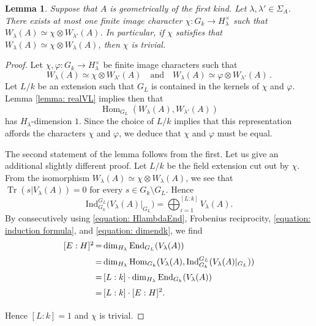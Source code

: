 \documentclass[oneside]{amsart}
\newtheorem{lemma}[theorem]{Lemma}
\theoremstyle{remark}
\newcommand{\Ind}{\mathrm{Ind}}
\newcommand{\End}{\operatorname{End}}
\newcommand{\Hom}{\operatorname{Hom}}
\newcommand{\Tr}{\operatorname{Tr}}
\numberwithin{equation}{section}
\begin{document}
\begin{lemma}\label{lemma: unique}
Suppose that $A$ is geometrically of the first kind. Let $\lambda,\lambda'\in \Sigma_A$. There exists at most one finite image character $\chi \colon G_k\rightarrow H_\lambda^ \times$ such that $W_\lambda(A)\simeq \chi\otimes W_{\lambda'} (A)$. In particular, if $\chi$ satisfies that $W_\lambda(A) \simeq \chi \otimes W_\lambda (A)$, then $\chi$ is trivial.
\end{lemma}

\begin{proof}
Let $\chi,\varphi \colon G_k\rightarrow H_\lambda^ \times$ be finite image characters such that 
$$
W_\lambda(A)\simeq \chi\otimes W_{\lambda'} (A)\quad \text{and} \quad W_\lambda(A)\simeq \varphi\otimes W_{\lambda'} (A)\,.
$$
Let $L/k$ be an extension such that $G_L$ is contained in the kernels of $\chi$ and $\varphi$. Lemma \ref{lemma: realVL} implies then that  
$$
\Hom_{G_L}(W_\lambda(A),W_{\lambda'}(A))
$$
has $H_\lambda$-dimension $1$. Since the choice of $L/k$ implies that this representation affords the characters $\chi$ and $\varphi$, we deduce that $\chi$ and $\varphi$ must be equal. 

The second statement of the lemma follows from the first. Let us give an additional slightly different proof.
Let $L/k$ be the field extension cut out by $\chi$. From the isomorphism $W_\lambda(A) \simeq \chi \otimes W_\lambda (A)$, we see that $\Tr(s|V_\lambda(A))=0$ for every $s\in G_k\setminus G_L$.
Hence
\begin{equation}\label{equation: induction formula}
\Ind^{G_L}_{G_k}\big(V_{\lambda}(A)|_{G_L}\big)=\bigoplus_{i=1}^{[L:k]}V_{\lambda}(A).
\end{equation}
By consecutively using \eqref{equation: HlambdaEnd}, Frobenius reciprocity, \eqref{equation: induction formula}, and \eqref{equation: dimendk}, we find
$$
\begin{array}{l@{\,=\,}l}
[E:H]^2 & \displaystyle{ \dim_{H_\lambda} \End_{G_L}(V_\lambda(A))}\\[6pt]
 & \displaystyle{\dim_{H_\lambda} \Hom_{G_k}(V_\lambda(A),\Ind^{G_L}_{G_k}(V_\lambda(A)|_{G_L}))}\\[6pt]
 & \displaystyle{[L:k]\cdot \dim_{H_\lambda} \End_{G_k}(V_\lambda(A))}\\[6pt]
  & \displaystyle{[L:k]\cdot [E:H]^2.}\\[6pt]
\end{array}
$$
Hence $[L:k]=1$ and $\chi$ is trivial.
\end{proof}
\end{document}
